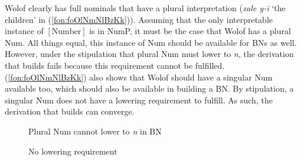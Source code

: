 \documentclass[output=paper]{langscibook}
\begin{document}
Wolof clearly has full nominals that have a plural interpretation (\textit{xale y-i} `the children' in (\ref{fon:foOlNmNlBzKk})). Assuming that the only interpretable instance of $[\mbox{Number}]$ is in NumP, it must be the case that Wolof has a plural Num. All things equal, this instance of Num should be available for BNs as well. However, under the stipulation that plural Num must lower to \textit{n}, the derivation that builds  fails because this requirement cannot be fulfilled. (\ref{fon:foOlNmNlBzKk}) also shows that Wolof should have a singular Num available too, which should also be available in building a BN. By stipulation, a singular Num does not have a lowering requirement to fulfill. As such, the derivation that builds  can converge.

\begin{figure}[h]
\RawFloats
\centering
\begin{minipage}[b]{0.49\textwidth}
\centering
{}
\caption{Plural Num cannot lower to \textit{n} in BN}
\label{fon:dErIvVBnSgPl1}
\end{minipage}
\begin{minipage}[b]{0.49\textwidth}
\centering
{}
\caption{No lowering requirement}
\label{fon:dErIvVBnSgPl2}
\end{minipage}
\end{figure}
\end{document}
